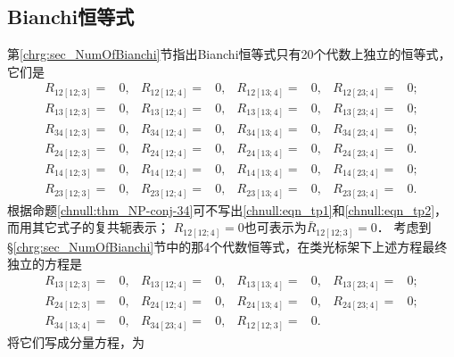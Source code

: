 \subsection{Bianchi恒等式}
第\ref{chrg:sec_NumOfBianchi}节指出Bianchi恒等式只有20个代数上独立的恒等式，它们是
\begin{subequations}
    \begin{align}
        R_{12[12;3]}=&0, & R_{12[12;4]}=&0, & R_{12[13;4]}=&0, & R_{12[23;4]}=&0;  \\
        R_{13[12;3]}=&0, & R_{13[12;4]}=&0, & R_{13[13;4]}=&0, & R_{13[23;4]}=&0;  \\
        R_{34[12;3]}=&0, & R_{34[12;4]}=&0, & R_{34[13;4]}=&0, & R_{34[23;4]}=&0;  \\
        R_{24[12;3]}=&0, & R_{24[12;4]}=&0, & R_{24[13;4]}=&0, & R_{24[23;4]}=&0.  \\
        R_{14[12;3]}=&0, & R_{14[12;4]}=&0, & R_{14[13;4]}=&0, & R_{14[23;4]}=&0; \label{chnull:eqn_tp1} \\
        R_{23[12;3]}=&0, & R_{23[12;4]}=&0, & R_{23[13;4]}=&0, & R_{23[23;4]}=&0. \label{chnull:eqn_tp2}
    \end{align}
\end{subequations}
根据命题\ref{chnull:thm_NP-conj-34}可不写出\eqref{chnull:eqn_tp1}和\eqref{chnull:eqn_tp2}，
而用其它式子的复共轭表示；
$R_{12[12;4]}= 0$也可表示为$\bar{R}_{12[12;3]}=0$．
考虑到\S\ref{chrg:sec_NumOfBianchi}节中的那4个代数恒等式，在类光标架下上述方程最终
独立的方程是
\begin{subequations}
    \begin{align}
        R_{13[12;3]}=&0, & R_{13[12;4]}=&0, & R_{13[13;4]}=&0, & R_{13[23;4]}=&0;  \\
        R_{24[12;3]}=&0, & R_{24[12;4]}=&0, & R_{24[13;4]}=&0, & R_{24[23;4]}=&0; \\
        R_{34[13;4]}=&0, & R_{34[23;4]}=&0, & R_{12[12;3]}=&0. & {} &
    \end{align}
\end{subequations}
将它们写成分量方程\cite[\S 8e]{chandrasekhar-1983}\cite[\S 7.3]{stephani-exe-2003}，为
\setlength{\mathindent}{0em} 
